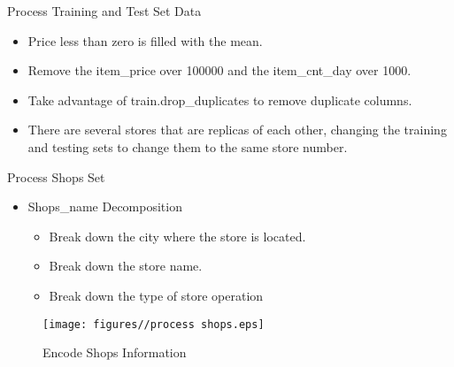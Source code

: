 \documentclass[
 size=14pt,
 paper=smartboard,  %
 mode=present, 		%
 display=slides, 	%
 style=tuliplab,  	%
 pauseslide,
 fleqn,leqno]{powerdot}
\begin{document}
\begin{slide}{Process Training and Test Set Data}
\begin{itemize}
\item
Price less than zero is filled with the mean.
\item
Remove the item\_price over 100000 and the item\_cnt\_day over 1000.
\item
Take advantage of train.drop\_duplicates to remove duplicate columns.
\item
There are several stores that are replicas of each other, changing the training and testing sets to change them to the same store number.
\end{itemize}

\end{slide}


\begin{slide}{Process Shops Set}
\begin{itemize}
\item
Shops\_name Decomposition
\begin{itemize}
\item
\smallskip
Break down the city where the store is located.
\item
\smallskip
Break down the store name.
\item
\smallskip
Break down the type of store operation
\end{itemize}
\end{itemize}
\begin{figure}
	\centering
	\texttt{[image: figures//process shops.eps]}
	\caption{Encode Shops Information}\label{fig:timg}
\end{figure}

\end{slide}
\end{document}

